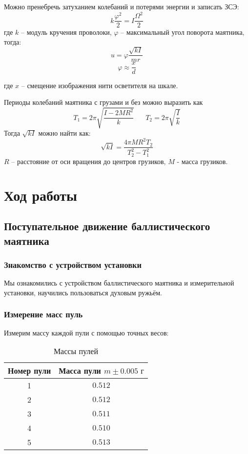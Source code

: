 \documentclass[a4paper]{article}
\begin{document}
	Можно пренебречь затуханием колебаний и потерями энергии и записать ЗСЭ:
	$$ k \frac{\varphi^2}{2} = I \frac{\Omega^2}{2} $$
	\noindent где $k$ -- модуль кручения проволоки, $\varphi$ -- максимальный угол поворота маятника, тогда:
	\begin{equation} \label{vel2}
		 u = \varphi \frac{\sqrt{kI}}{mr}
	\end{equation}
\begin{equation}
		\label{phi}
		\varphi \approx \frac{x}{d}
	\end{equation}

	где $x$ -- смещение изображения нити осветителя на шкале.

	Периоды колебаний маятника с грузами и без можно выразить как
	$$T_1= 2 \pi \sqrt{\frac{I - 2MR^2}{k}} \;\;\;\;\;\; T_2 = 2 \pi \sqrt{\frac{I}{k}}$$
	Тогда $\sqrt{kI}$ можно найти как:
	\begin{equation}
		\sqrt{kI} = \frac{4 \pi M R^2 T_2}{T_2^2 - T_1^2}
		\label{kl}
	\end{equation}
	$R$ -- расстояние от оси вращения до центров грузиков, $M$ - масса грузиков.

\section{Ход работы}

\subsection{Поступательное движение баллистического маятника}

\subsubsection{Знакомство с устройством установки}

Мы ознакомились с устройством баллистического маятника и измерительной установки, научились пользоваться духовым ружьём.

\subsubsection{Измерение масс пуль}

Измерим массу каждой пули с помощью точных весов:

\begin{table}[h!]
\centering
\caption{Массы пулей}
\begin{tabular}{|c|c|}
\hline
Номер пули & Масса пули $m \pm{0.005}\text{ г}$  \\ \hline
1  & $0.512$ \\ \hline
2  & $0.512$ \\ \hline
3  & $0.511$ \\ \hline
4  & $0.510$ \\ \hline
5  & $0.513$ \\ \hline
\end{tabular}
\end{table}
\end{document}
